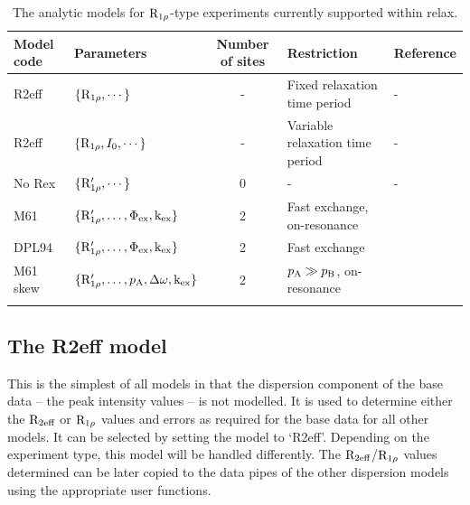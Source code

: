 \begin{table}
\begin{center}
\caption{The analytic models for $\mathrm{R}_{1\rho}$-type experiments currently supported within relax.}
\begin{tabular}{llcll}
\toprule
Model code              & Parameters                                        & Number of sites   & Restriction                       & Reference \\
\midrule
R2eff                   & $\{\mathrm{R}_{1\rho}, \cdots\}$                            & -                 & Fixed relaxation time period      & - \\
R2eff                   & $\{\mathrm{R}_{1\rho}, I_0, \cdots\}$                       & -                 & Variable relaxation time period   & - \\
No Rex                  & $\{\mathrm{R}_{1\rho}', \cdots\}$                       & 0                 & -                                 & - \\
M61                     & $\{\mathrm{R}_{1\rho}', \dots, \Phi_\textrm{ex}, \textrm{k}_\textrm{ex}\}$          & 2                 & Fast exchange, on-resonance       & \citet{Meiboom61} \\
DPL94                   & $\{\mathrm{R}_{1\rho}', \dots, \Phi_\textrm{ex}, \textrm{k}_\textrm{ex}\}$          & 2                 & Fast exchange                     & \citet{Davis94} \\
M61 skew                & $\{\mathrm{R}_{1\rho}', \dots, p_\textrm{A}, \Delta\omega, \textrm{k}_\textrm{ex}\}$        & 2                 & $p_\textrm{A} \gg p_\textrm{B}$, on-resonance       & \citet{Meiboom61} \\
\bottomrule
\label{table: R1rho dispersion models}
\end{tabular}
\end{center}
\end{table}



\clearpage

\subsection{The R2eff model}

This is the simplest of all models in that the dispersion component of the base data -- the peak intensity values -- is not modelled.  It is used to determine either the $\mathrm{R}_{2\textrm{eff}}$ or $\mathrm{R}_{1\rho}$ values and errors as required for the base data for all other models.  It can be selected by setting the model to `R2eff'.  Depending on the experiment type, this model will be handled differently.  The $\mathrm{R}_{2\textrm{eff}}$/$\mathrm{R}_{1\rho}$ values determined can be later copied to the data pipes of the other dispersion models using the appropriate user functions.


